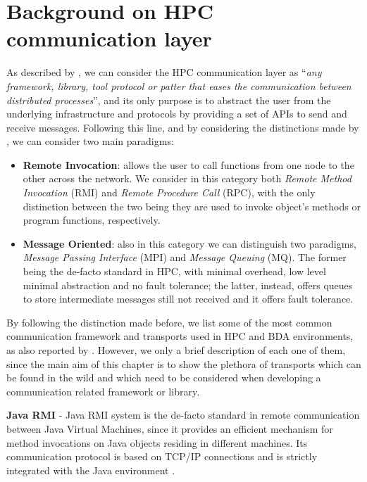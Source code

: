 \chapter{Background on HPC communication layer}
\label{chap:background}
As described by \cite{survey-distributed}, we can consider the HPC communication layer as ``\textit{any framework, library, tool protocol or patter that eases the communication between distributed processes}'', and its only purpose is to abstract the user from the underlying infrastructure and protocols by providing a set of APIs to send and receive messages. Following this line, and by considering the distinctions made by \cite{survey-distributed}, we can consider two main paradigms:
\begin{itemize}
	\item \textbf{Remote Invocation}: allows the user to call functions from one node to the other across the network. We consider in this category both \textit{Remote Method Invocation} (RMI) and \textit{Remote Procedure Call} (RPC), with the only distinction between the two being they are used to invoke object's methods or program functions, respectively. 
	\item \textbf{Message Oriented}: also in this category we can distinguish two paradigms, \textit{Message Passing Interface} (MPI) and \textit{Message Queuing} (MQ). The former being the de-facto standard in HPC, with minimal overhead, low level minimal abstraction and no fault tolerance; the latter, instead, offers queues to store intermediate messages still not received and it offers fault tolerance. 
\end{itemize}

By following the distinction made before, we list some of the most common communication framework and transports used in HPC and BDA environments, as also reported by \cite{survey-distributed}. However, we only a brief description of each one of them, since the main aim of this chapter is to show the plethora of transports which can be found in the wild and which need to be considered when developing a communication related framework or library.

\textbf{Java RMI} -  Java RMI system \cite{javarmi} is the de-facto standard in remote communication between Java Virtual Machines, since it provides an efficient mechanism for method invocations on Java objects residing in different machines. Its communication protocol is based on TCP/IP connections and is strictly integrated with the Java environment \cite{javaRMI-toHPC++}.\newline


